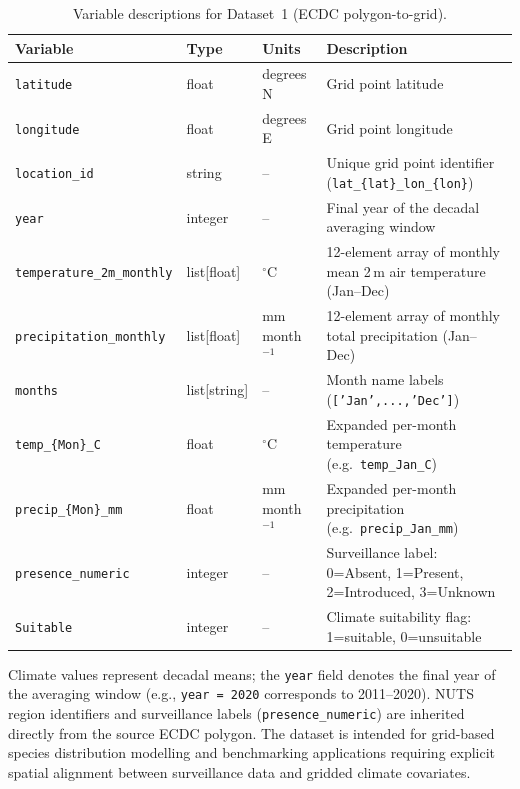 \documentclass[11pt]{article}
\begin{document}
\begin{table}[htbp]
\caption{Variable descriptions for Dataset~1 (ECDC polygon-to-grid).}
\label{tab:vars_ecdc}
\small
\setlength{\tabcolsep}{4pt}
\begin{tabular}{p{5.5cm}p{2.0cm}p{2.2cm}p{4.6cm}}
\hline
Variable & Type & Units & Description \\
\hline
\texttt{latitude} & float & degrees\,N & Grid point latitude \\
\texttt{longitude} & float & degrees\,E & Grid point longitude \\
\texttt{location\_id} & string & -- & Unique grid point identifier 
  (\texttt{lat\_\{lat\}\_lon\_\{lon\}}) \\
\texttt{year} & integer & -- & Final year of the decadal averaging window \\
\texttt{temperature\_2m\_monthly} & list[float] & $^{\circ}$C & 
  12-element array of monthly mean 2\,m air temperature (Jan--Dec) \\
\texttt{precipitation\_monthly} & list[float] & mm\,month$^{-1}$ & 
  12-element array of monthly total precipitation (Jan--Dec) \\
\texttt{months} & list[string] & -- & Month name labels 
  (\texttt{['Jan',...,'Dec']}) \\
\texttt{temp\_\{Mon\}\_C} & float & $^{\circ}$C & 
  Expanded per-month temperature (e.g.\ \texttt{temp\_Jan\_C}) \\
\texttt{precip\_\{Mon\}\_mm} & float & mm\,month$^{-1}$ & 
  Expanded per-month precipitation (e.g.\ \texttt{precip\_Jan\_mm}) \\
\texttt{presence\_numeric} & integer & -- & 
  Surveillance label: 0=Absent, 1=Present, 2=Introduced, 3=Unknown \\
\texttt{Suitable} & integer & -- & 
  Climate suitability flag: 1=suitable, 0=unsuitable \\
\hline
\end{tabular}
\end{table}

Climate values represent decadal means; the \texttt{year} field denotes 
the final year of the averaging window (e.g., \texttt{year~=~2020} 
corresponds to 2011--2020). NUTS region identifiers and surveillance 
labels (\texttt{presence\_numeric}) are inherited directly from the 
source ECDC polygon. The dataset is intended for grid-based species 
distribution modelling and benchmarking applications requiring explicit 
spatial alignment between surveillance data and gridded climate covariates.
\end{document}
